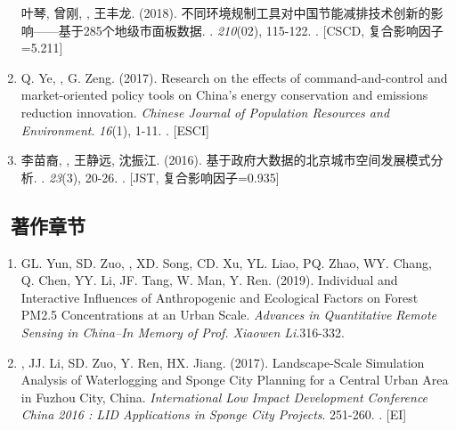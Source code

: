 \begin{enumerate}
    叶琴, 曾刚, {}, 王丰龙. (2018).
	不同环境规制工具对中国节能减排技术创新的影响——基于285个地级市面板数据.
    {}. \textit{210}(02), 115-122.
    . [CSCD, 复合影响因子=5.211]
\item
    Q. Ye, \Shaoqing, G. Zeng. (2017).
	Research on the effects of command-and-control and market-oriented policy tools on China’s energy conservation and emissions reduction innovation.
    \textit{Chinese Journal of Population Resources and Environment}. \textit{16}(1), 1-11.
    . [ESCI]
\item
   李苗裔, {}, 王静远, 沈振江. (2016).
	基于政府大数据的北京城市空间发展模式分析.
    {}. \textit{23}(3), 20-26.
    . [JST, 复合影响因子=0.935]
\end{enumerate}

\subsection*{\texorpdfstring{\faBook\ 著作章节}{著作章节}}
\begin{enumerate}
\item
    GL. Yun, SD. Zuo, \Shaoqing, XD. Song, CD. Xu, YL. Liao, PQ. Zhao, WY. Chang, Q. Chen, YY. Li, JF. Tang, W. Man, Y. Ren. (2019).
	Individual and Interactive Influences of Anthropogenic and Ecological Factors on Forest PM2.5 Concentrations at an Urban Scale.
    \textit{Advances in Quantitative Remote Sensing in China–In Memory of Prof. Xiaowen Li}.316-332.
\item
    \Shaoqing, JJ. Li, SD. Zuo, Y. Ren, HX. Jiang. (2017).
	Landscape-Scale Simulation Analysis of Waterlogging and Sponge City Planning for a Central Urban Area in Fuzhou City, China.
    \textit{International Low Impact Development Conference China 2016 : LID Applications in Sponge City Projects}. 251-260.
    . [EI]
\end{enumerate}


